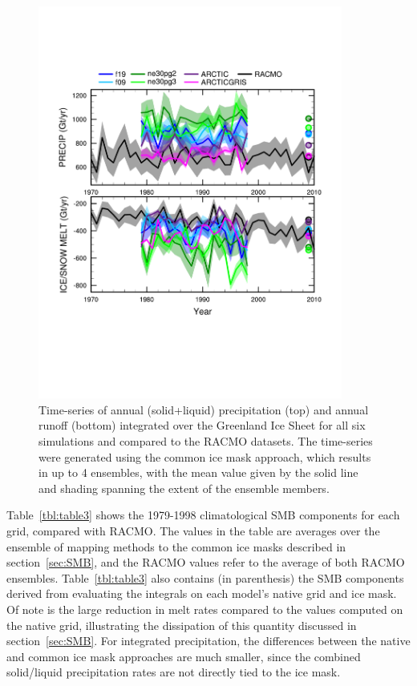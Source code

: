 \documentclass[draft]{agujournal2019}
\begin{document}
\begin{figure}[t]
\begin{center}
         \includegraphics[width=100mm]{figs/temp_tseries_GRIS.pdf}
\end{center}
\caption{Time-series of annual (solid+liquid) precipitation (top) and annual runoff (bottom) integrated over the Greenland Ice Sheet for all six simulations and compared to the RACMO datasets. The time-series were generated using the common ice mask approach, which results in up to 4 ensembles, with the mean value given by the solid line and shading spanning the extent of the ensemble members.}
\label{fig:tseries}
\end{figure}

Table~\ref{tbl:table3} shows the 1979-1998 climatological SMB components for each grid, compared with RACMO. The values in the table are averages over the ensemble of mapping methods to the common ice masks described in section~\ref{sec:SMB}, and the RACMO values refer to the average of both RACMO ensembles. Table~\ref{tbl:table3} also contains (in parenthesis) the SMB components derived from evaluating the integrals on each model's native grid and ice mask. Of note is the large reduction in melt rates compared to the values computed on the native grid, illustrating the dissipation of this quantity discussed in section~\ref{sec:SMB}. For integrated precipitation, the differences between the native and common ice mask approaches are much smaller, since the combined solid/liquid precipitation rates are not directly tied to the ice mask.
\end{document}
